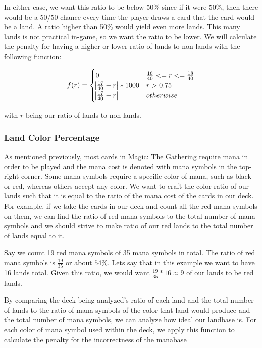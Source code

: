 \documentclass[12pt, letterpaper]{article}
\begin{document}
In either case,
we want this ratio to be below 50\% since if it were 50\%,
then there would be a 50/50 chance every time the player draws a card that the card would be a land.
A ratio higher than 50\% would yield even more lands.
This many lands is not practical in-game,
so we want the ratio to be lower.
We will calculate the penalty for having a higher
or lower ratio of lands to non-lands with the following function:

$$
f(r) = \begin{cases}
    0 & \frac{16}{40} <= r <= \frac{18}{40} \\
    \abs{\frac{17}{40} - r} * 1000 & r > 0.75 \\
    \abs{\frac{17}{40} - r} & otherwise
\end{cases}
$$

with $ r $ being our ratio of lands to non-lands.

\subsubsection{Land Color Percentage}
\label{objective:Land Color Percentage}

As mentioned previously,
most cards in Magic: The Gathering require mana in order to be played
and the mana cost is denoted with mana symbols in the top-right corner.
Some mana symbols require a specific color of mana, such as black or red,
whereas others accept any color.
We want to craft the color ratio of our lands such that it is equal to
the ratio of the mana cost of the cards in our deck.
For example,
if we take the cards in our deck and count all the red mana symbols on them,
we can find the ratio of red mana symbols to the total number of mana symbols
and we should strive to make ratio of our red lands to the total number of lands equal to it.

Say we count 19 red mana symbols of 35 mana symbols in total.
The ratio of red mana symbols is $ \frac{19}{35} $ or about $ 54\% $.
Lets say that in this example we want to have 16 lands total.
Given this ratio,
we would want $ \frac{19}{35} * 16 \approx 9 $ of our lands to be red lands.

By comparing the deck being analyzed's ratio of each land and the total number of lands
to the ratio of mana symbols of the color that land would produce and the total number of mana symbols,
we can analyze how ideal our landbase is. For each color of mana symbol used within the deck,
we apply this function to calculate the penalty for the incorrectness of the manabase
\end{document}
